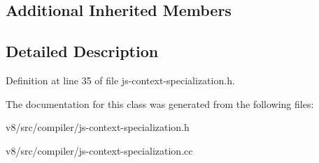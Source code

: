 \subsection*{Additional Inherited Members}


\subsection{Detailed Description}


Definition at line 35 of file js-\/context-\/specialization.\+h.



The documentation for this class was generated from the following files\+:\begin{DoxyCompactItemize}
\item 
v8/src/compiler/js-\/context-\/specialization.\+h\item 
v8/src/compiler/js-\/context-\/specialization.\+cc\end{DoxyCompactItemize}
